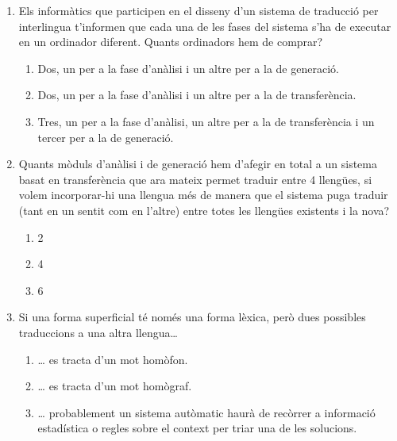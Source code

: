 \begin{enumerate}
\item Els informàtics que participen en el disseny d'un sistema de
  traducció per interlingua t'informen que cada una de les fases del
  sistema s'ha de executar en un ordinador diferent. Quants ordinadors
  hem de comprar?
  \begin{enumerate}
  \item Dos, un per a la fase d'anàlisi i un altre per a la de
    generació.
  \item Dos, un per a la fase d'anàlisi i un altre per a la de
    transferència.
  \item Tres, un per a la fase d'anàlisi, un altre per a la de
    transferència i un tercer per a la de generació.
  \end{enumerate}

\item Quants mòduls d'anàlisi i de generació hem d'afegir en total a
  un sistema basat en transferència que ara mateix permet traduir
  entre 4 llengües, si volem incorporar-hi una llengua més de manera
  que el sistema puga traduir (tant en un sentit com en l'altre) entre
  totes les llengües existents i la nova?
  \begin{enumerate}
  \item 2
  \item 4
  \item 6
  \end{enumerate}

\item Si una forma superficial té només una forma lèxica, però dues
  possibles traduccions a una altra llengua{\ldots}   
  \begin{enumerate}
  \item {\ldots} es tracta d'un mot homòfon.
  \item {\ldots} es tracta d'un mot homògraf.
  \item {\ldots} probablement un sistema autòmatic haurà de recòrrer a
    informació estadística o regles sobre el context per triar una de
    les solucions.
  \end{enumerate}


\end{enumerate}
